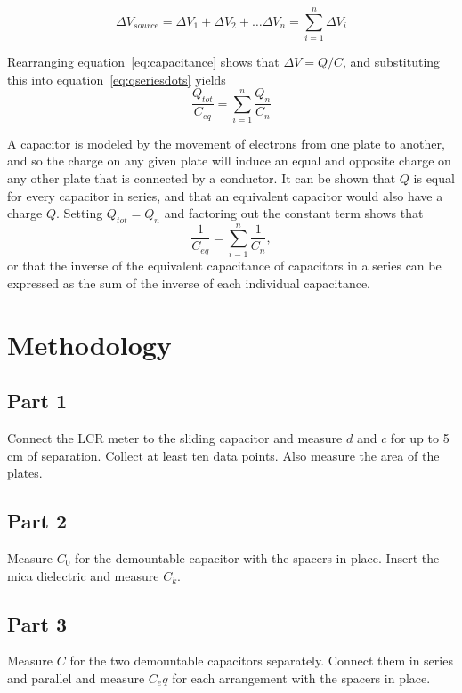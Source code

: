 \documentclass[twocolumn,english]{IEEEtran}
\theoremstyle{plain}
\theoremstyle{plain}
\begin{document}
  \begin{equation}\label{eq:qseriesdots}
  \Delta V_{source} = \Delta V_1 + \Delta V_2 + \dots \Delta V_n = \sum_{i=1}^{n} \Delta V_i
  \end{equation}

  Rearranging equation~\ref{eq:capacitance} shows that $\Delta V=Q/C$, and substituting this into equation~\ref{eq:qseriesdots} yields
  \begin{equation*}
  \frac{Q_{tot}}{C_{eq}} = \sum_{i=1}^{n} \frac{Q_n}{C_n}
  \end{equation*}

  A capacitor is modeled by the movement of electrons from one plate to another, and so the charge on any given plate will induce an equal and opposite charge on any other plate that is connected by a conductor. It can be shown that $Q$ is equal for every capacitor in series, and that an equivalent capacitor would also have a charge $Q$. Setting $Q_{tot} = {Q_n}$ and factoring out the constant term shows that
  \begin{equation}
  \frac{1}{C_{eq}} = \sum_{i=1}^{n} \frac{1}{C_n},
  \end{equation}
  or that the inverse of the equivalent capacitance of capacitors in a series can be expressed as the sum of the inverse of each individual capacitance.

\section{Methodology}

\subsection*{Part 1}
Connect the LCR meter to the sliding capacitor and measure $d$ and $c$ for up to 5 cm of separation. Collect at least ten data points. Also measure the area of the plates.
\subsection*{Part 2}
Measure $C_0$ for the demountable capacitor with the spacers in place. Insert the mica dielectric and measure $C_k$.
\subsection*{Part 3}
Measure $C$ for the two demountable capacitors separately. Connect them in series and parallel and measure $C_eq$ for each arrangement with the spacers in place.
\end{document}

